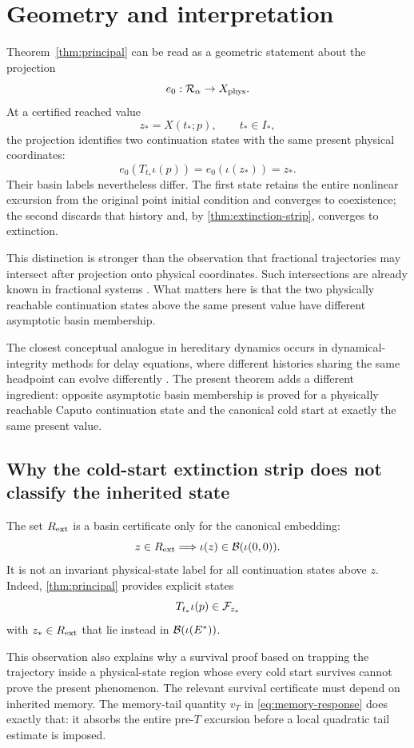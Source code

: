 \section{Geometry and interpretation}
\label{sec:geometry}

Theorem~\ref{thm:principal} can be read as a geometric statement about the projection
\[
  e_0:\mathcal{R}_{\alpha}\to X_{\mathrm{phys}}.
\]
At a certified reached value
\[
  z_*=X(t_*;p),
  \qquad t_*\in I_*,
\]
the projection identifies two continuation states with the same present physical coordinates:
\[
  e_0(T_{t_*}\iota(p))
  =
  e_0(\iota(z_*))
  =
  z_*.
\]
Their basin labels nevertheless differ. The first state retains the entire nonlinear excursion from the original point initial condition and converges to coexistence; the second discards that history and, by \cref{thm:extinction-strip}, converges to extinction.

This distinction is stronger than the observation that fractional trajectories may intersect after projection onto physical coordinates. Such intersections are already known in fractional systems \cite{DeshpandeDaftardarGejjiVellaisamy2019}. What matters here is that the two physically reachable continuation states above the same present value have different asymptotic basin membership.

The closest conceptual analogue in hereditary dynamics occurs in dynamical-integrity methods for delay equations, where different histories sharing the same headpoint can evolve differently \cite{SzakszStepanHabib2024DynamicalIntegrity}. The present theorem adds a different ingredient: opposite asymptotic basin membership is proved for a physically reachable Caputo continuation state and the canonical cold start at exactly the same present value.

\subsection{Why the cold-start extinction strip does not classify the inherited state}

The set \(R_{\mathrm{ext}}\) is a basin certificate only for the canonical embedding:
\[
  z\in R_{\mathrm{ext}}
  \Longrightarrow
  \iota(z)\in\mathcal{B}(\iota(0,0)).
\]
It is not an invariant physical-state label for all continuation states above \(z\). Indeed, \cref{thm:principal} provides explicit states
\[
  T_{t_*}\iota(p)\in\mathcal{F}_{z_*}
\]
with \(z_*\in R_{\mathrm{ext}}\) that lie instead in \(\mathcal{B}(\iota(E^{*}))\).

This observation also explains why a survival proof based on trapping the trajectory inside a physical-state region whose every cold start survives cannot prove the present phenomenon. The relevant survival certificate must depend on inherited memory. The memory-tail quantity \(v_T\) in \eqref{eq:memory-response} does exactly that: it absorbs the entire pre-\(T\) excursion before a local quadratic tail estimate is imposed.

